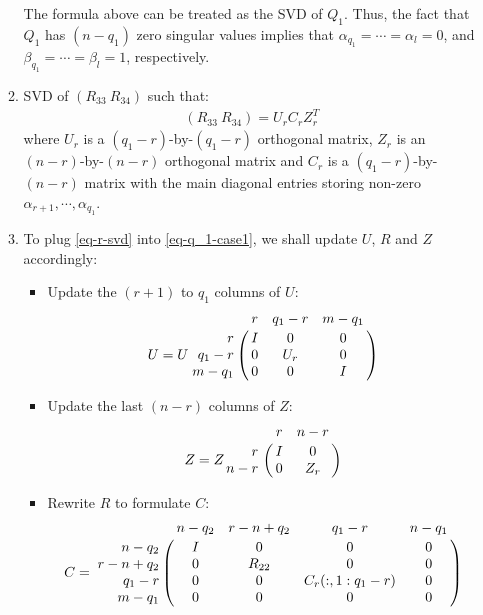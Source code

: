 \begin{enumerate}
\begin{enumerate}
                    The formula above can be treated as the SVD of $Q_1$. Thus, the fact that $Q_1$ has $(n-q_1)$ zero singular values implies that $\alpha_{q_1} = \cdots = \alpha_{l} = 0$, and $\beta_{q_1} = \cdots = \beta_{l} = 1$, respectively. 
                \item SVD of $(R_{33} \ R_{34})$ such that:
                    \begin{align} \label{eq-r-svd}
                        (R_{33} \ R_{34}) = U_{r}C_{r}Z_{r}^{T}
                    \end{align}   
                    where $U_{r}$ is a $(q_1-r)$-by-$(q_1-r)$ orthogonal matrix, $Z_{r}$ is an $(n-r)$-by-$(n-r)$ orthogonal matrix and $C_{r}$ is a $(q_1-r)$-by-$(n-r)$ matrix with the main diagonal entries storing non-zero $\alpha_{r+1}, \cdots, \alpha_{q_1}$.
                    \item To plug \eqref{eq-r-svd} into \eqref{eq-q_1-case1}, we shall update $U$, $R$ and $Z$ accordingly:
                        \begin{itemize}
                            \item Update the $(r+1)$ to $q_1$ columns of $U$:
                                \begin{displaymath}
                                    U = U\bordermatrix{ & r & q_1-r & m-q_1 \cr
                                    \hfill r & I & 0 & 0 \cr
                                    \hfill q_1-r & 0 & U_{r} & 0 \cr
                                    \hfill m-q_1 & 0 & 0 & I}
                                \end{displaymath}
                            \item Update the last $(n-r)$ columns of $Z$:
                                \begin{displaymath}
                                    Z = Z\bordermatrix{ & r & n-r \cr
                                    \hfill r & I & 0 \cr
                                    \hfill n-r & 0 & Z_{r}}
                                \end{displaymath}
                            \item Rewrite $R$ to formulate $C$:
                                \begin{displaymath}
                                    C = \bordermatrix{ & n-q_2 & r-n+q_2 & q_1-r & n-q_1 \cr
                                    \hfill n-q_2 & I & 0 & 0 & 0 \cr
                                    \hfill r-n+q_2 & 0 & R_{22} & 0 & 0 \cr
                                    \hfill q_1-r & 0 & 0 & C_{r}(:,1:q_1-r) & 0 \cr
                                    \hfill m-q_1 & 0 & 0 & 0 & 0}
                                \end{displaymath}
                        \end{itemize}
                    

\end{enumerate}
\end{enumerate}
